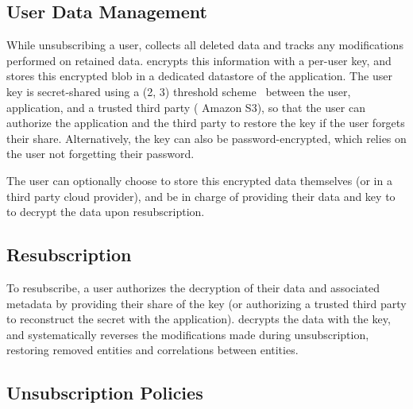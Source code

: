 \subsection{User Data Management}
\label{sec:design:storage}
While unsubscribing a user, \sys collects all deleted data and tracks any modifications performed
on retained data.  \sys encrypts this information with a per-user key, and stores this encrypted
blob in a dedicated datastore of the application. The user key is secret-shared using a (2, 3)
threshold scheme~\cite{secretsharing} between the user, application, and a trusted third party (\eg
Amazon S3), so that the user can authorize the application and the third party to restore the key if
the user forgets their share.  Alternatively, the key can also be password-encrypted, which relies
on the user not forgetting their password.

The user can optionally choose to store this encrypted data themselves (or in a third party cloud
provider), and be in charge of providing their data and key to \sys to decrypt the data upon
resubscription.

\subsection{Resubscription}
To resubscribe, a user authorizes the decryption of their data and associated metadata by
providing their share of the key (or authorizing a trusted third party to reconstruct the secret
with the application). \sys decrypts the data with the key, and systematically reverses 
the modifications made during unsubscription, restoring removed entities and correlations between
entities.

\subsection{Unsubscription Policies}
\label{sec:design:unsub}

